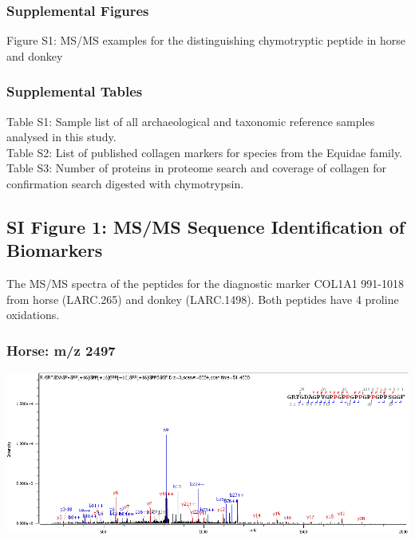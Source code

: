 \documentclass[
]{article}
\begin{document}
\hypertarget{supplemental-figures}{%
\subsubsection*{Supplemental Figures}\label{supplemental-figures}}

Figure S1: MS/MS examples for the distinguishing chymotryptic peptide in horse and donkey\\

\hypertarget{supplemental-tables}{%
\subsubsection*{Supplemental Tables}\label{supplemental-tables}}

Table S1: Sample list of all archaeological and taxonomic reference samples analysed in this study.\\
Table S2: List of published collagen markers for species from the Equidae family.\\
Table S3: Number of proteins in proteome search and coverage of collagen for confirmation search digested with chymotrypsin.

\newpage

\hypertarget{si-figure-1-msms-sequence-identification-of-biomarkers}{%
\subsection*{SI Figure 1: MS/MS Sequence Identification of Biomarkers}\label{si-figure-1-msms-sequence-identification-of-biomarkers}}

The MS/MS spectra of the peptides for the diagnostic marker COL1A1 991-1018 from horse (LARC.265) and donkey (LARC.1498). Both peptides have 4 proline oxidations.

\hypertarget{horse-mz-2497}{%
\subsubsection*{Horse: m/z 2497}\label{horse-mz-2497}}

\begin{center}\includegraphics{../img/265-2497} \end{center}
\end{document}
